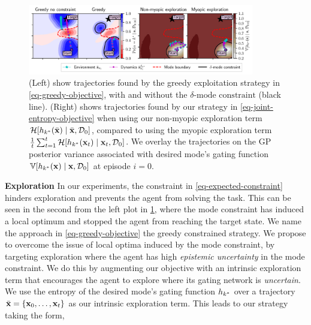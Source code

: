 \documentclass[twoside]{article}
\newcommand{\state}{\ensuremath{\mathbf{x}}}
\newcommand{\dataset}{\ensuremath{\mathcal{D}}}
\newcommand{\gatingFunc}{\ensuremath{h}}
\begin{document}
\begin{figure}[!t]
    \centering
    \includegraphics[width=0.88\textwidth]{../experiments/figures/greedy_and_myopic_comparisons.pdf}
  \caption{(Left) show trajectories found by the greedy exploitation strategy in \cref{eq-greedy-objective}, with and without
  the $\delta\text{-mode constraint}$ (black line).
  (Right) shows trajectories found by our strategy in \cref{eq-joint-entropy-objective} when using our
  non-myopic exploration term $\mathcal{H}[\gatingFunc_{\desiredMode}(\stateTraj) \mid \stateTraj, \dataset_{0}]$,
  compared to using the myopic exploration term
  $\frac{1}{\TimeInd}\sum_{\timeInd=1}^{\TimeInd} \mathcal{H}[\gatingFunc_{\desiredMode}(\state_{\timeInd}) \mid \state_{\timeInd}, \dataset_{0}]$.
  We overlay the trajectories on the GP posterior variance associated with desired mode's gating function
  $\mathbb{V}[\gatingFunc_{\desiredMode}(\state) \mid \state, \dataset_{0}]$ at episode $i=0$.}
  \label{fig-ablations}
\end{figure}
\textbf{Exploration}
In our experiments, the constraint in \cref{eq-expected-constraint} hinders exploration and prevents the agent from solving the task.
This can be seen in the second from the left plot in \cref{fig-ablations}, where the mode constraint has induced a local
optimum and stopped the agent from reaching the target state.
We name the approach in \cref{eq-greedy-objective} the greedy constrained strategy.
We propose to overcome the issue of local optima induced by the mode constraint,
by targeting exploration where the agent has high \emph{epistemic uncertainty} in the mode constraint.
We do this by augmenting our objective with an intrinsic exploration term that encourages the agent to explore where its gating network is \emph{uncertain}.
We use the entropy of the desired mode's gating function \(\gatingFunc_{\desiredMode}\) over a
trajectory \(\stateTraj=\{\state_{0},\ldots, \state_{\TimeInd} \}\) as our intrinsic exploration term.
This leads to our strategy taking the form,
\end{document}

